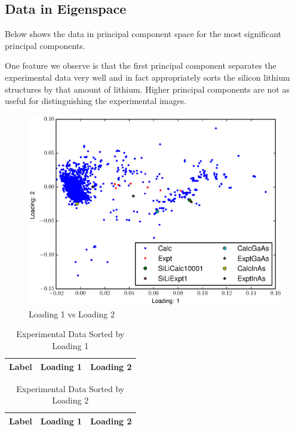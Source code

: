 \documentclass[12pt,letterpaper]{article}
\begin{document}
\subsection{Data in Eigenspace}
Below shows the data in principal component space for the most significant
principal components.

One feature we observe is that the first principal component separates the
experimental data very well and in fact appropriately sorts the silicon lithium
structures by that amount of lithium. Higher principal components are not as
useful for distinguishing the experimental images.

\begin{figure}[ht]
  \begin{center}
    \includegraphics[scale=0.8]{figs/eigenspace1-2.eps}
    \caption{Loading 1 vs  Loading 2}
  \end{center}
\end{figure}

\begin{table}[ht]
  \begin{center}
  \begin{tabular}{|l|l|l|}
    \hline
    \textbf{Label} & \textbf{Loading 1} & \textbf{Loading 2} \\ \hline
    
  \end{tabular}
  \caption{Experimental Data Sorted by Loading 1}
  \end{center}
\end{table}

\begin{table}[h]
  \begin{center}
  \begin{tabular}{|l|l|l|}
    \hline
    \textbf{Label} & \textbf{Loading 1} & \textbf{Loading 2} \\ \hline
    
  \end{tabular}
  \caption{Experimental Data Sorted by Loading 2}
  \end{center}
\end{table}
\end{document}
